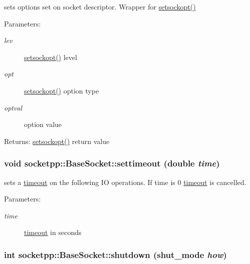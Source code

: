 \begin{CompactItemize}
sets options set on socket descriptor. Wrapper for \hyperlink{classsocketpp_1_1BaseSocket_3f1f168e4953c046bb1159941da2fa30}{setsockopt()} 

\begin{Desc}
\item[Parameters:]
\begin{description}
\item[{\em lev}]\hyperlink{classsocketpp_1_1BaseSocket_3f1f168e4953c046bb1159941da2fa30}{setsockopt()} level \item[{\em opt}]\hyperlink{classsocketpp_1_1BaseSocket_3f1f168e4953c046bb1159941da2fa30}{setsockopt()} option type \item[{\em optval}]option value \end{description}
\end{Desc}
\begin{Desc}
\item[Returns:]\hyperlink{classsocketpp_1_1BaseSocket_3f1f168e4953c046bb1159941da2fa30}{setsockopt()} return value \end{Desc}
\hypertarget{classsocketpp_1_1BaseSocket_0804d148470fd742cda495d3533b25c6}{
\subsubsection[{settimeout}]{\setlength{\rightskip}{0pt plus 5cm}void socketpp::BaseSocket::settimeout (double {\em time})}}
\label{classsocketpp_1_1BaseSocket_0804d148470fd742cda495d3533b25c6}


sets a \hyperlink{classsocketpp_1_1timeout}{timeout} on the following IO operations. If time is 0 \hyperlink{classsocketpp_1_1timeout}{timeout} is cancelled. 

\begin{Desc}
\item[Parameters:]
\begin{description}
\item[{\em time}]\hyperlink{classsocketpp_1_1timeout}{timeout} in seconds \end{description}
\end{Desc}
\hypertarget{classsocketpp_1_1BaseSocket_7550a79d05baaf4b19c20fa0fa9bc8b9}{
\subsubsection[{shutdown}]{\setlength{\rightskip}{0pt plus 5cm}int socketpp::BaseSocket::shutdown (shut\_\-mode {\em how})}}
\label{classsocketpp_1_1BaseSocket_7550a79d05baaf4b19c20fa0fa9bc8b9}



\end{CompactItemize}
